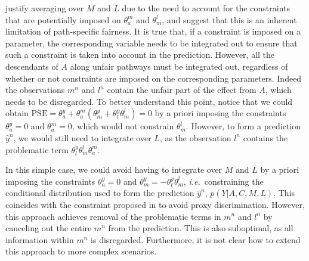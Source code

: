 \documentclass{article}
\newcommand{\ie}{\emph{i.e.}}
\begin{document}
\citet{nabi18fair} justify averaging over $M$ and $L$ due to the need to account for the constraints that are potentially imposed on $\theta^m_{a}$ and $\theta^l_{m}$, 
and suggest that this is an inherent limitation of path-specific fairness. It is true that, if a constraint is imposed on a parameter, the corresponding variable needs to be integrated out 
to ensure that such a constraint is taken into account in the prediction. However, all the descendants of $A$ along unfair pathways must be integrated out, regardless of whether or not constraints are imposed on the corresponding parameters. 
Indeed the observations $m^n$ and $l^n$ contain the unfair part of the effect from $A$, which needs to be disregarded. 
To better understand this point, notice that we could obtain 
$\textrm{PSE}=\theta^y_{a}+\theta^m_{a}(\theta^y_{m}+\theta^y_{l}\theta^l_{m})=0$ by a priori imposing the constraints $\theta^y_{a}=0$ and $\theta^m_{a}=0$,
which would not constrain $\theta^l_{m}$. However, to form a prediction $\hat y^n$, we would still need to integrate over $L$, as the observation $l^n$ contains the problematic term $\theta^y_{l}\theta^l_{m}\theta^m_{a}$.

In this simple case, we could avoid having to integrate over $M$ and $L$ by a priori imposing the constraints $\theta^y_{a}=0$ and $\theta^y_{m}=-\theta^y_{l}\theta^l_{m}$, \ie~constraining 
the conditional distribution used to form the prediction $\hat y^n$, $p(Y|A,C,M,L)$. This coincides with the constraint proposed in \citet{kilbertus17avoiding} to avoid proxy discrimination. 
However, this approach achieves removal of the problematic terms in $m^n$ and $l^n$ by canceling out the entire $m^n$ from the prediction. 
This is also suboptimal, as all information within $m^n$ is disregarded. Furthermore, it is not clear how to extend this approach to more complex scenarios.
\end{document}

